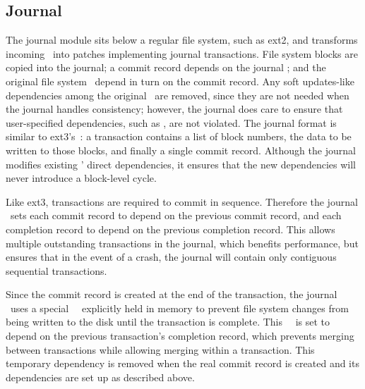 
\subsection{Journal}
\label{sec:modules:journal}

The journal module sits below a regular file system, such as ext2, and transforms
incoming \patches\ into patches implementing journal transactions.
%
File system blocks are copied into the journal; a commit record depends on the
journal \patches; and the original file system \patches\ depend in turn on the
commit record.
%
Any soft updates-like dependencies among the original \patches\ are removed,
since they are not needed when the journal handles consistency; however, the
journal does care to ensure that user-specified dependencies, such as
\patchgroups, are not violated.
%
%
The journal format is similar to ext3's~\cite{tweedie98journaling}: a
transaction contains a list of block numbers, the data to be written to
those blocks, and finally a single commit record.
%
Although the journal modifies existing \patches' direct dependencies, it
ensures that the new dependencies will never introduce a block-level
cycle.

Like ext3, transactions are required to commit in sequence. Therefore the
journal \module\ sets each commit record to depend on the previous commit record, and each
completion record to depend on the previous completion record. This allows
multiple outstanding transactions in the journal, which benefits performance,
but ensures that in the event of a crash, the journal will contain only
contiguous sequential transactions.

Since the commit record is created at the end of the transaction, the journal
\module\ uses a special \noop\ \patch\ explicitly held in memory to prevent
file system changes from being written to the disk until the transaction is
complete. This \noop\ \patch\ is set to depend on the previous transaction's
completion record, which prevents merging between transactions while allowing
merging within a transaction. This temporary dependency is removed when the
real commit record is created and its dependencies are set up as described
above.

